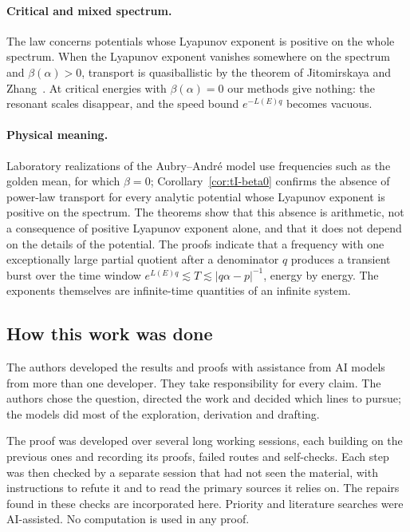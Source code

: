 \paragraph{Critical and mixed spectrum.} The law concerns potentials whose Lyapunov exponent is positive on the whole spectrum. When the Lyapunov exponent vanishes somewhere on the spectrum and $\beta(\alpha)>0$, transport is quasiballistic by the theorem of Jitomirskaya and Zhang~\cite[Theorem~3]{JZ2022}. At critical energies with $\beta(\alpha)=0$ our methods give nothing: the resonant scales disappear, and the speed bound $e^{-L(E)q}$ becomes vacuous.

\paragraph{Physical meaning.} Laboratory realizations of the Aubry--Andr\'e model use frequencies such as the golden mean, for which $\beta=0$; Corollary~\ref{cor:tI-beta0} confirms the absence of power-law transport for every analytic potential whose Lyapunov exponent is positive on the spectrum. The theorems show that this absence is arithmetic, not a consequence of positive Lyapunov exponent alone, and that it does not depend on the details of the potential. The proofs indicate that a frequency with one exceptionally large partial quotient after a denominator $q$ produces a transient burst over the time window $e^{L(E)q}\lesssim T\lesssim|q\alpha-p|^{-1}$, energy by energy. The exponents themselves are infinite-time quantities of an infinite system.

\subsection*{How this work was done}

The authors developed the results and proofs with assistance from AI models from more than one developer. They take responsibility for every claim. The authors chose the question, directed the work and decided which lines to pursue; the models did most of the exploration, derivation and drafting.

The proof was developed over several long working sessions, each building on the previous ones and recording its proofs, failed routes and self-checks. Each step was then checked by a separate session that had not seen the material, with instructions to refute it and to read the primary sources it relies on. The repairs found in these checks are incorporated here. Priority and literature searches were AI-assisted. No computation is used in any proof.
